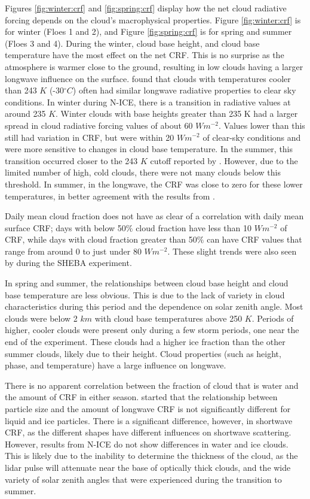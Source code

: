 Figures \ref{fig:winter:crf} and \ref{fig:spring:crf} display how the net cloud radiative forcing depends on the cloud's macrophysical properties. Figure \ref{fig:winter:crf} is for winter (Floes 1 and 2), and Figure \ref{fig:spring:crf} is for spring and summer (Floes 3 and 4). During the winter, cloud base height, and cloud base temperature have the most effect on the net CRF. This is no surprise as the atmosphere is warmer close to the ground, resulting in low clouds having a larger longwave influence on the surface. \citet{shupe:2004} found that clouds with temperatures cooler than 243 $K$ (-30$^{\circ}C$) often had similar longwave radiative properties to clear sky conditions. In winter during N-ICE, there is a transition in radiative values at around 235 $K$. Winter clouds with base heights greater than 235 K had a larger spread in cloud radiative forcing values of about 60 $Wm^{-2}$. Values lower than this still had variation in CRF, but were within 20 $Wm^{-2}$ of clear-sky conditions and were more sensitive to changes in cloud base temperature. In the summer, this transition occurred closer to the 243 $K$ cutoff reported by \citet{shupe:2004}. However, due to the limited number of high, cold clouds, there were not many clouds below this threshold. In summer, in the longwave, the CRF was close to zero for these lower temperatures, in better agreement with the results from \citet{shupe:2004}. 

Daily mean cloud fraction does not have as clear of a correlation with daily mean surface CRF; days with below 50$\%$ cloud fraction have less than 10 $Wm^{-2}$ of CRF, while days with cloud fraction greater than 50$\%$ can have CRF values that range from around 0 to just under 80 $Wm^{-2}$. These slight trends were also seen by \citet{shupe:2004} during the SHEBA experiment. 

In spring and summer, the relationships between cloud base height and cloud base temperature are less obvious. This is due to the lack of variety in cloud characteristics during this period and the dependence on solar zenith angle. Most clouds were below 2 $km$ with cloud base temperatures above 250 $K$. Periods of higher, cooler clouds were present only during a few storm periods, one near the end of the experiment. These clouds had a higher ice fraction than the other summer clouds, likely due to their height. Cloud properties (such as height, phase, and temperature) have a large influence on longwave.

There is no apparent correlation between the fraction of cloud that is water and the amount of CRF in either season. \citet{schweiger:1999} started that the relationship between particle size and the amount of longwave CRF is not significantly different for liquid and ice particles. There is a significant difference, however, in shortwave CRF, as the different shapes have different influences on shortwave scattering. However, results from N-ICE do not show differences in water and ice clouds. This is likely due to the inability to determine the thickness of the cloud, as the lidar pulse will attenuate near the base of optically thick clouds, and the wide variety of solar zenith angles that were experienced during the transition to summer. 

